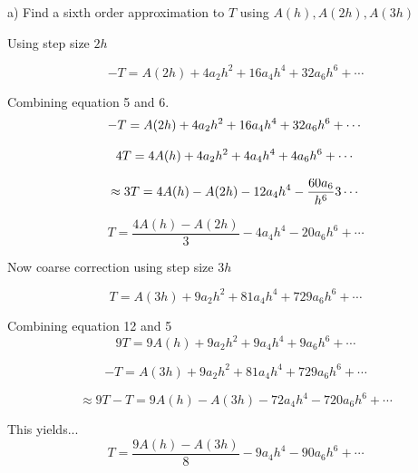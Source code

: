 \documentclass{article}
\begin{document}
a) Find a sixth order approximation to $T$ using $A(h), A(2h), A(3h)$

Using step size $ 2h $

\begin{equation}
-T = A(2h) + 4a_{2}h^{2} + 16a_4h^{4} + 32a_{6}h^{6} + \cdots
\end{equation}

Combining equation 5 and 6.
\begin{equation}
-T = A(2h) + 4a_{2}h^{2} + 16a_4h^{4} + 32a_{6}h^{6} + \cdots \\
\end{equation}

\begin{equation}
	4T = 4A(h) + 4a_{2}h^{2} + 4a_{4}h^{4} + 4a_{6}h^{6} + \cdots \\
\end{equation}

\begin{equation}
	 \approx 3T = 4A(h) - A(2h) - 12a_{4}h^{4} - \frac{60a_{6}}{h^{6}}{3} \cdots \\
\end{equation}

\begin{equation}
  T = \dfrac{4A(h) - A(2h)}{3} - 4a_{4}h^{4} - 20a_{6}h^{6} + \cdots
\end{equation}

Now coarse correction using step size $3h$

\begin{equation}
  T = A(3h) + 9a_{2}h^{2} + 81a_{4}h^{4} + 729a_{6}h^{6} + \cdots
\end{equation}

Combining equation 12 and 5
\begin{equation}
 9T = 9A(h) + 9a_{2}h^{2} + 9a_{4}h^{4} + 9a_{6}h^{6} + \cdots
\end{equation}

\begin{equation}
-T = A(3h) + 9a_{2}h^{2} + 81a_{4}h^{4} + 729a_{6}h^{6} + \cdots
\end{equation}

\begin{equation}
\approx 9T - T = 9A(h) - A(3h) - 72a_{4}h^{4} - 720a_{6}h^{6} + \cdots
\end{equation}

This yields...
\begin{equation}
T = \frac{9A(h) - A(3h)}{8} - 9a_{4}h^{4} - 90a_{6}h^{6} + \cdots
\end{equation}
\end{document}
